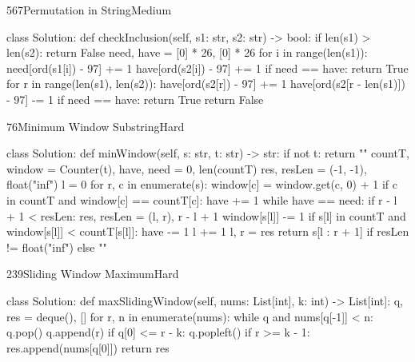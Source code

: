 \begin{problem}{567}{Permutation in String}{Medium}
\begin{code}
class Solution:
    def checkInclusion(self, s1: str, s2: str) -> bool:
        if len(s1) > len(s2):
            return False
        need, have = [0] * 26, [0] * 26
        for i in range(len(s1)):
            need[ord(s1[i]) - 97] += 1
            have[ord(s2[i]) - 97] += 1
        if need == have:
            return True
        for r in range(len(s1), len(s2)):
            have[ord(s2[r]) - 97] += 1
            have[ord(s2[r - len(s1)]) - 97] -= 1
            if need == have:
                return True
        return False
\end{code}
\end{problem}

\begin{problem}{76}{Minimum Window Substring}{Hard}
\begin{code}
class Solution:
    def minWindow(self, s: str, t: str) -> str:
        if not t:
            return ""
        countT, window = Counter(t), {}
        have, need = 0, len(countT)
        res, resLen = (-1, -1), float("inf")
        l = 0
        for r, c in enumerate(s):
            window[c] = window.get(c, 0) + 1
            if c in countT and window[c] == countT[c]:
                have += 1
            while have == need:
                if r - l + 1 < resLen:
                    res, resLen = (l, r), r - l + 1
                window[s[l]] -= 1
                if s[l] in countT and window[s[l]] < countT[s[l]]:
                    have -= 1
                l += 1
        l, r = res
        return s[l : r + 1] if resLen != float("inf") else ""
\end{code}
\end{problem}

\begin{problem}{239}{Sliding Window Maximum}{Hard}
\begin{code}
class Solution:
    def maxSlidingWindow(self, nums: List[int], k: int) -> List[int]:
        q, res = deque(), []
        for r, n in enumerate(nums):
            while q and nums[q[-1]] < n:
                q.pop()
            q.append(r)
            if q[0] <= r - k:
                q.popleft()
            if r >= k - 1:
                res.append(nums[q[0]])
        return res
\end{code}
\end{problem}
